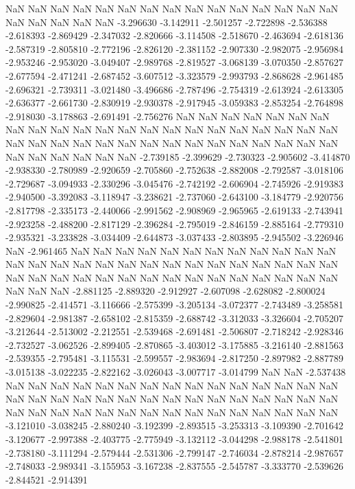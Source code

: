 NaN
NaN
NaN
NaN
NaN
NaN
NaN
NaN
NaN
NaN
NaN
NaN
NaN
NaN
NaN
NaN
NaN
NaN
NaN
NaN
-3.296630
-3.142911
-2.501257
-2.722898
-2.536388
-2.618393
-2.869429
-2.347032
-2.820666
-3.114508
-2.518670
-2.463694
-2.618136
-2.587319
-2.805810
-2.772196
-2.826120
-2.381152
-2.907330
-2.982075
-2.956984
-2.953246
-2.953020
-3.049407
-2.989768
-2.819527
-3.068139
-3.070350
-2.857627
-2.677594
-2.471241
-2.687452
-3.607512
-3.323579
-2.993793
-2.868628
-2.961485
-2.696321
-2.739311
-3.021480
-3.496686
-2.787496
-2.754319
-2.613924
-2.613305
-2.636377
-2.661730
-2.830919
-2.930378
-2.917945
-3.059383
-2.853254
-2.764898
-2.918030
-3.178863
-2.691491
-2.756276
NaN
NaN
NaN
NaN
NaN
NaN
NaN
NaN
NaN
NaN
NaN
NaN
NaN
NaN
NaN
NaN
NaN
NaN
NaN
NaN
NaN
NaN
NaN
NaN
NaN
NaN
NaN
NaN
NaN
NaN
NaN
NaN
NaN
NaN
NaN
NaN
NaN
NaN
NaN
NaN
NaN
NaN
NaN
-2.739185
-2.399629
-2.730323
-2.905602
-3.414870
-2.938330
-2.780989
-2.920659
-2.705860
-2.752638
-2.882008
-2.792587
-3.018106
-2.729687
-3.094933
-2.330296
-3.045476
-2.742192
-2.606904
-2.745926
-2.919383
-2.940500
-3.392083
-3.118947
-3.238621
-2.737060
-2.643100
-3.184779
-2.920756
-2.817798
-2.335173
-2.440066
-2.991562
-2.908969
-2.965965
-2.619133
-2.743941
-2.923258
-2.488200
-2.817129
-2.396284
-2.795019
-2.846159
-2.885164
-2.779310
-2.935321
-3.233828
-3.034409
-2.644873
-3.037433
-2.803895
-2.945502
-3.226946
NaN
-2.961465
NaN
NaN
NaN
NaN
NaN
NaN
NaN
NaN
NaN
NaN
NaN
NaN
NaN
NaN
NaN
NaN
NaN
NaN
NaN
NaN
NaN
NaN
NaN
NaN
NaN
NaN
NaN
NaN
NaN
NaN
NaN
NaN
NaN
NaN
NaN
NaN
NaN
NaN
NaN
NaN
NaN
NaN
NaN
NaN
NaN
-2.881125
-2.889320
-2.912927
-2.607098
-2.628082
-2.800024
-2.990825
-2.414571
-3.116666
-2.575399
-3.205134
-3.072377
-2.743489
-3.258581
-2.829604
-2.981387
-2.658102
-2.815359
-2.688742
-3.312033
-3.326604
-2.705207
-3.212644
-2.513002
-2.212551
-2.539468
-2.691481
-2.506807
-2.718242
-2.928346
-2.732527
-3.062526
-2.899405
-2.870865
-3.403012
-3.175885
-3.216140
-2.881563
-2.539355
-2.795481
-3.115531
-2.599557
-2.983694
-2.817250
-2.897982
-2.887789
-3.015138
-3.022235
-2.822162
-3.026043
-3.007717
-3.014799
NaN
NaN
-2.537438
NaN
NaN
NaN
NaN
NaN
NaN
NaN
NaN
NaN
NaN
NaN
NaN
NaN
NaN
NaN
NaN
NaN
NaN
NaN
NaN
NaN
NaN
NaN
NaN
NaN
NaN
NaN
NaN
NaN
NaN
NaN
NaN
NaN
NaN
NaN
NaN
NaN
NaN
NaN
NaN
NaN
NaN
NaN
NaN
NaN
-3.121010
-3.038245
-2.880240
-3.192399
-2.893515
-3.253313
-3.109390
-2.701642
-3.120677
-2.997388
-2.403775
-2.775949
-3.132112
-3.044298
-2.988178
-2.541801
-2.738180
-3.111294
-2.579444
-2.531306
-2.799147
-2.746034
-2.878214
-2.987657
-2.748033
-2.989341
-3.155953
-3.167238
-2.837555
-2.545787
-3.333770
-2.539626
-2.844521
-2.914391
